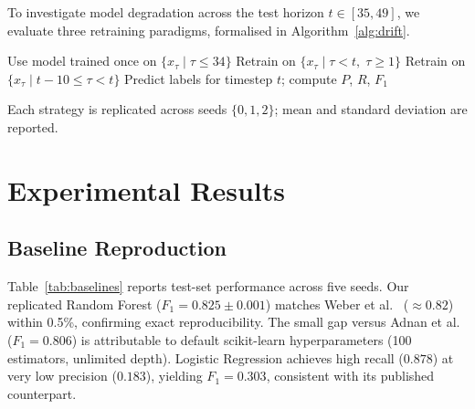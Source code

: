 \documentclass[conference]{IEEEtran}
\begin{document}
To investigate model degradation across the test horizon $t\in[35,49]$,
we evaluate three retraining paradigms, formalised in
Algorithm~\ref{alg:drift}.

\begin{algorithm}[t]
\caption{Retraining Strategies for Drift Mitigation}
\label{alg:drift}
\begin{algorithmic}[1]
    \STATE Use model trained once on $\{x_\tau \mid \tau \leq 34\}$
    \STATE Retrain on $\{x_\tau \mid \tau < t,\; \tau \geq 1\}$
    \STATE Retrain on $\{x_\tau \mid t{-}10 \leq \tau < t\}$
  \ENDIF
  \STATE Predict labels for timestep $t$; compute $P$, $R$, $F_1$
\ENDFOR
\end{algorithmic}
\end{algorithm}

Each strategy is replicated across seeds $\{0,1,2\}$; mean and standard
deviation are reported.

\section{Experimental Results}
\label{sec:results}

\subsection{Baseline Reproduction}

Table~\ref{tab:baselines} reports test-set performance across five seeds.
Our replicated Random Forest ($F_1 = 0.825 \pm 0.001$) matches
Weber et al.~\cite{weber2019anti} (${\approx}0.82$) within 0.5\%,
confirming exact reproducibility.
The small gap versus Adnan et al.~\cite{adnan2026statistical}
($F_1 = 0.806$) is attributable to default scikit-learn hyperparameters
(100 estimators, unlimited depth).
Logistic Regression achieves high recall ($0.878$) at very low precision
($0.183$), yielding $F_1 = 0.303$, consistent with its published counterpart.
\end{document}
